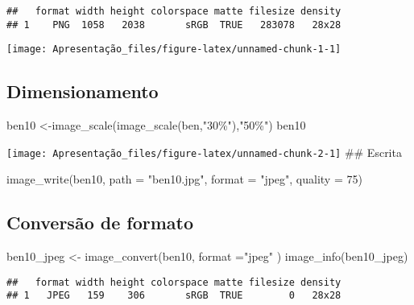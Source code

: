 \documentclass[
]{article}
\newenvironment{Shaded}{\begin{snugshade}}{\end{snugshade}}
\newcommand{\AttributeTok}[1]{\textcolor[rgb]{0.77,0.63,0.00}{#1}}
\newcommand{\DecValTok}[1]{\textcolor[rgb]{0.00,0.00,0.81}{#1}}
\newcommand{\FunctionTok}[1]{\textcolor[rgb]{0.00,0.00,0.00}{#1}}
\newcommand{\NormalTok}[1]{#1}
\newcommand{\OtherTok}[1]{\textcolor[rgb]{0.56,0.35,0.01}{#1}}
\newcommand{\StringTok}[1]{\textcolor[rgb]{0.31,0.60,0.02}{#1}}
\begin{document}
\begin{verbatim}
##   format width height colorspace matte filesize density
## 1    PNG  1058   2038       sRGB  TRUE   283078   28x28
\end{verbatim}

\texttt{[image: Apresentação\_files/figure-latex/unnamed-chunk-1-1]}

\hypertarget{dimensionamento}{%
\subsection{Dimensionamento}\label{dimensionamento}}

\begin{Shaded}
\begin{Highlighting}[]
\NormalTok{ben10 }\OtherTok{\textless{}{-}}\FunctionTok{image\_scale}\NormalTok{(}\FunctionTok{image\_scale}\NormalTok{(ben,}\StringTok{"30\%"}\NormalTok{),}\StringTok{"50\%"}\NormalTok{)}
\NormalTok{ben10}
\end{Highlighting}
\end{Shaded}

\texttt{[image: Apresentação\_files/figure-latex/unnamed-chunk-2-1]}
\#\# Escrita

\begin{Shaded}
\begin{Highlighting}[]
\FunctionTok{image\_write}\NormalTok{(ben10, }\AttributeTok{path =} \StringTok{"ben10.jpg"}\NormalTok{, }\AttributeTok{format =} \StringTok{"jpeg"}\NormalTok{, }\AttributeTok{quality =} \DecValTok{75}\NormalTok{)}
\end{Highlighting}
\end{Shaded}

\hypertarget{conversuxe3o-de-formato}{%
\subsection{Conversão de formato}\label{conversuxe3o-de-formato}}

\begin{Shaded}
\begin{Highlighting}[]
\NormalTok{ben10\_jpeg }\OtherTok{\textless{}{-}} \FunctionTok{image\_convert}\NormalTok{(ben10, }\AttributeTok{format =}\StringTok{"jpeg"}\NormalTok{ )}
\FunctionTok{image\_info}\NormalTok{(ben10\_jpeg)}
\end{Highlighting}
\end{Shaded}

\begin{verbatim}
##   format width height colorspace matte filesize density
## 1   JPEG   159    306       sRGB  TRUE        0   28x28
\end{verbatim}
\end{document}
